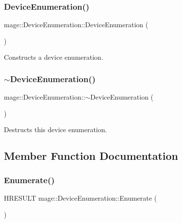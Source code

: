 \subsubsection{\texorpdfstring{Device\+Enumeration()}{DeviceEnumeration()}}
{\footnotesize\ttfamily mage\+::\+Device\+Enumeration\+::\+Device\+Enumeration (\begin{DoxyParamCaption}{ }\end{DoxyParamCaption})\hspace{0.3cm}{\ttfamily [protected]}}

Constructs a device enumeration. \hypertarget{classmage_1_1_device_enumeration_a6a8cfc259c1e8c98ba0a9780c42a5ffe}{}\label{classmage_1_1_device_enumeration_a6a8cfc259c1e8c98ba0a9780c42a5ffe} 
\subsubsection{\texorpdfstring{$\sim$\+Device\+Enumeration()}{~DeviceEnumeration()}}
{\footnotesize\ttfamily mage\+::\+Device\+Enumeration\+::$\sim$\+Device\+Enumeration (\begin{DoxyParamCaption}{ }\end{DoxyParamCaption})\hspace{0.3cm}{\ttfamily [protected]}}

Destructs this device enumeration. 

\subsection{Member Function Documentation}
\hypertarget{classmage_1_1_device_enumeration_a4fea0ffef733632456b281f74608a239}{}\label{classmage_1_1_device_enumeration_a4fea0ffef733632456b281f74608a239} 
\subsubsection{\texorpdfstring{Enumerate()}{Enumerate()}}
{\footnotesize\ttfamily H\+R\+E\+S\+U\+LT mage\+::\+Device\+Enumeration\+::\+Enumerate (\begin{DoxyParamCaption}{ }\end{DoxyParamCaption})\hspace{0.3cm}{\ttfamily [protected]}}

